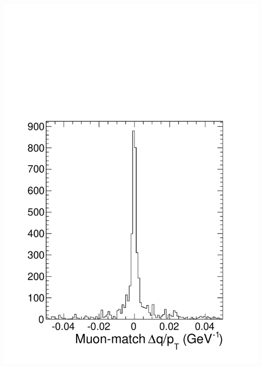 \documentclass[compress]{beamer}
\begin{document}
\begin{frame}
\begin{columns}
\includegraphics[width=\linewidth]{match_dqoverpt_background.pdf}
\end{columns}
\end{frame}
\end{document}
